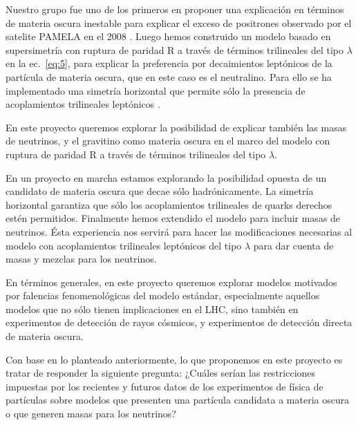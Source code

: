 Nuestro grupo \cite{Nardi:2008ix} fue uno de los primeros en proponer
una explicación en términos de materia oscura inestable para explicar
el exceso de positrones observado por el satelite PAMELA en el
2008 \cite{Adriani:2008zr}. Luego hemos construido un modelo basado en
supersimetría con ruptura de paridad R a través de términos
trilineales del tipo $\lambda$ en la ec.~\eqref{eq:5}, para explicar
la preferencia por decaimientos leptónicos de la partícula de materia
oscura, que en este caso es el neutralino. Para ello se ha
implementado una simetría horizontal que permite sólo la presencia de
acoplamientos trilineales leptónicos \cite{Sierra:2009zq}. 
\begin{proyecto}
  En este proyecto queremos explorar la posibilidad de explicar
  también las masas de neutrinos, y el gravitino como materia oscura
  en el marco del modelo con ruptura de paridad R a través de términos
  trilineales del tipo $\lambda$.
\end{proyecto}
 En un proyecto en marcha estamos explorando la posibilidad
opuesta de un candidato de materia oscura que decae sólo
hadrónicamente. La simetría horizontal garantiza que sólo los
acoplamientos trilineales de quarks derechos estén
permitidos. Finalmente hemos extendido el modelo para incluir masas de
neutrinos. Ésta experiencia nos servirá para hacer las modificaciones
necesarias al modelo con acoplamientos trilineales leptónicos del tipo
$\lambda$ para dar cuenta de masas y mezclas para los neutrinos. 



\begin{proyecto}
  En términos generales, en este proyecto queremos explorar modelos
  motivados por falencias fenomenológicas del modelo estándar,
  especialmente aquellos modelos que no sólo tienen implicaciones en
  el LHC, sino también en experimentos de detección de rayos cósmicos,
  y experimentos de detección directa de materia oscura.
\end{proyecto}




\begin{proyecto}
  Con base en lo planteado anteriormente, lo que proponemos en este
  proyecto es tratar de responder la siguiente pregunta: ¿Cuáles
  serían las restricciones impuestas por los recientes y futuros datos
  de los experimentos de física de partículas sobre modelos que
  presenten una partícula candidata a materia oscura o que generen
  masas para los neutrinos?
\end{proyecto}







